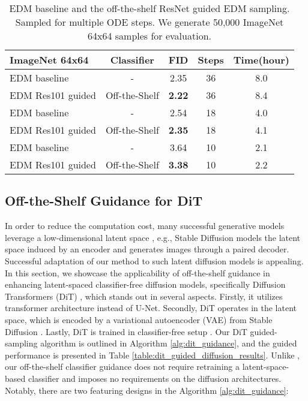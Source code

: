 \documentclass{article}
\theoremstyle{definition}
\begin{document}
\begin{table}[h!]
\caption{EDM \citep{karras2022edm} baseline and the off-the-shelf ResNet guided EDM sampling. Sampled for multiple ODE steps. We generate 50,000 ImageNet 64x64 samples for evaluation.}
\label{table:ode_edm_results}
\begin{center}
\begin{small}
\begin{sc}
\begin{tabular}{lcccc}
\toprule
ImageNet 64x64 & Classifier & FID & Steps & Time(hour) \\
\midrule
EDM baseline     & -  & 2.35 & 36 & 8.0   \\ 
EDM Res101 guided & Off-the-Shelf & \bf{2.22} & 36 & 8.4 \\ 
EDM baseline     & -  & 2.54 & 18 & 4.0 \\ 
EDM Res101 guided  & Off-the-Shelf & \bf{2.35} & 18 & 4.1\\ 
EDM baseline     & -  & 3.64 & 10 & 2.1 \\ 
EDM Res101 guided  & Off-the-Shelf & \bf{3.38} & 10 & 2.2\\ 
\bottomrule
\end{tabular}
\end{sc}
\end{small}
\end{center}
\end{table}


\subsection{Off-the-Shelf Guidance for DiT}
In order to reduce the computation cost, many successful generative models leverage a low-dimensional latent space \citep{chang2022maskgit, vahdat2021score, hu2023complexity}, e.g., Stable Diffusion \citep{rombach2022high} models the latent space induced by an encoder and generates images through a paired decoder. 
Successful adaptation of our method to such latent diffusion models is appealing. 
In this section, we showcase the applicability of off-the-shelf guidance in enhancing latent-spaced classifier-free diffusion models, specifically Diffusion Transformers (DiT) \citep{peebles2022scalable}, which stands out in several aspects. Firstly, it utilizes transformer architecture instead of U-Net. Secondly, DiT operates in the latent space, which is encoded by a variational autoencoder (VAE) \citep{kingma2013auto} from Stable Diffusion \citep{rombach2022high}. Lastly, DiT is trained in classifier-free setup \citep{ho2022classifier}. Our DiT guided-sampling algorithm is outlined in Algorithm \ref{alg:dit_guidance}, and the guided performance is presented in Table \ref{table:dit_guided_diffusion_results}.
Unlike \cite{wallace2023end}, our off-the-shelf classifier guidance does not require retraining a latent-space-based classifier and imposes no requirements on the diffusion architectures.
Notably, there are two featuring designs in the Algorithm \ref{alg:dit_guidance}: 
\end{document}
